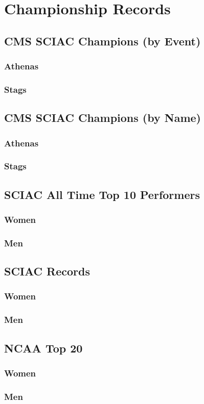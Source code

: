 \section{Championship Records}

\subsection{CMS SCIAC Champions (by Event)}
\subsubsection{Athenas}
\subsubsection{Stags}

\subsection{CMS SCIAC Champions (by Name)}
\subsubsection{Athenas}
\subsubsection{Stags}

\subsection{SCIAC All Time Top 10 Performers}
\subsubsection{Women}
\subsubsection{Men}

\subsection{SCIAC Records}
\subsubsection{Women}
\subsubsection{Men}

\subsection{NCAA Top 20}
\subsubsection{Women}
\subsubsection{Men}
